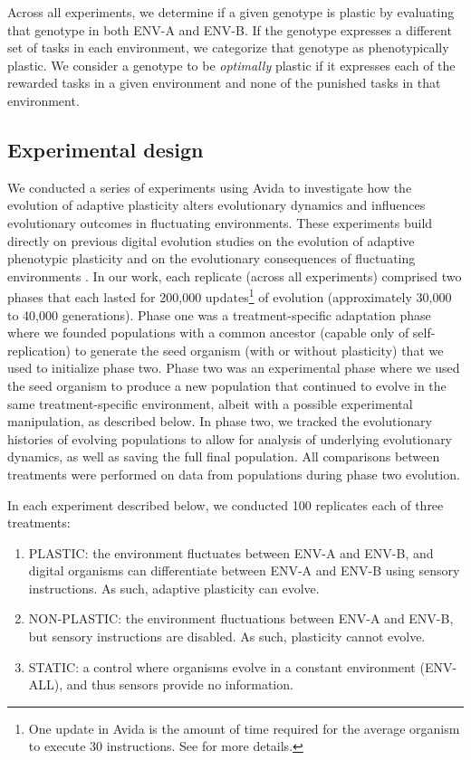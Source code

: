 Across all experiments, we determine if a given genotype is plastic by evaluating that genotype in both ENV-A and ENV-B. 
If the genotype expresses a different set of tasks in each environment, we categorize that genotype as phenotypically plastic.
We consider a genotype to be \textit{optimally} plastic if it expresses each of the rewarded tasks in a given environment and none of the punished tasks in that environment.

\vspace{0.7cm}
\subsection{Experimental design}

We conducted a series of experiments using Avida to investigate how the evolution of adaptive plasticity alters evolutionary dynamics and influences evolutionary outcomes in fluctuating environments.
These experiments build directly on previous digital evolution studies on the evolution of adaptive phenotypic plasticity \citep{clune_investigating_2007,lalejini_evolutionary_2016} and on the evolutionary consequences of fluctuating environments \citep{wilke_evolution_2001,canino-koning_fluctuating_2019}.
In our work, each replicate (across all experiments) comprised two phases that each lasted for 200,000 updates\footnote{
    One update in Avida is the amount of time required for the average organism to execute 30 instructions. 
    See \citep{ofria_avida:_2009} for more details.
} 
of evolution (approximately 30,000 to 40,000 generations).  
Phase one was a treatment-specific adaptation phase where we founded populations with a common ancestor (capable only of self-replication) to generate the seed organism (with or without plasticity) that we used to initialize phase two.
Phase two was an experimental phase where we used the seed organism to produce a new population that continued to evolve in the same treatment-specific environment, albeit with a possible experimental manipulation, as described below.
In phase two, we tracked the evolutionary histories of evolving populations to allow for analysis of underlying evolutionary dynamics, as well as saving the full final population.
All comparisons between treatments were performed on data from populations during phase two evolution.

% 

In each experiment described below, we conducted 100 replicates each of three treatments:
\begin{enumerate}
    \item PLASTIC: the environment fluctuates between ENV-A and ENV-B, and digital organisms can differentiate between ENV-A and ENV-B using sensory instructions. As such, adaptive plasticity can evolve.
    \item NON-PLASTIC: the environment fluctuations between ENV-A and ENV-B, but sensory instructions are disabled. As such, plasticity cannot evolve.
    \item STATIC: a control where organisms evolve in a constant environment (ENV-ALL), and thus sensors provide no information.
\end{enumerate}

